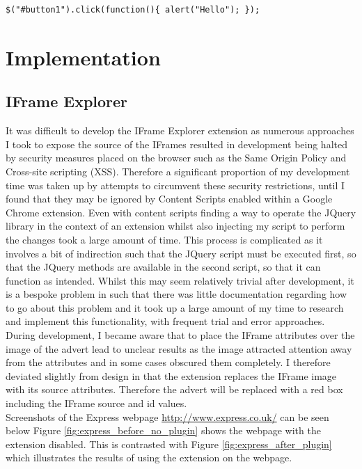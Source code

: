\documentclass[12pt]{article}
\begin{document}
\begin{lstlisting}[caption=Setting the onClick functionality of button in JQuery, label={jqExample}]
$("#button1").click(function(){ alert("Hello"); });
\end{lstlisting}

\pagebreak

\section{Implementation} \label{implementation}

\subsection{IFrame Explorer}
It was difficult to develop the IFrame Explorer extension as numerous approaches I took to expose the source of the IFrames resulted in development being halted by security measures placed on the browser such as the Same Origin Policy and Cross-site scripting (XSS). Therefore a significant proportion of my development time was taken up by attempts to circumvent these security restrictions, until I found that they may be ignored by Content Scripts enabled within a Google Chrome extension. Even with content scripts finding a way to operate the JQuery library in the context of an extension whilst also injecting my script to perform the changes took a large amount of time. This process is complicated as it involves a bit of indirection such that the JQuery script must be executed first, so that the JQuery methods are available in the second script, so that it can function as intended. Whilst this may seem relatively trivial after development, it is a bespoke problem in such that there was little documentation regarding how to go about this problem and it took up a large amount of my time to research and implement this functionality, with frequent trial and error approaches. \\

During development, I became aware that to place the IFrame attributes over the image of the advert lead to unclear results as the image attracted attention away from the attributes and in some cases obscured them completely. I therefore deviated slightly from design in that the extension replaces the IFrame image with its source attributes. Therefore the advert will be replaced with a red box including the IFrame source and id values. \\

Screenshots of the Express webpage \url{http://www.express.co.uk/} can be seen below Figure \ref{fig:express_before_no_plugin} shows the webpage with the extension disabled. This is contrasted with Figure \ref{fig:express_after_plugin} which illustrates the results of using the extension on the webpage. 
\end{document}
